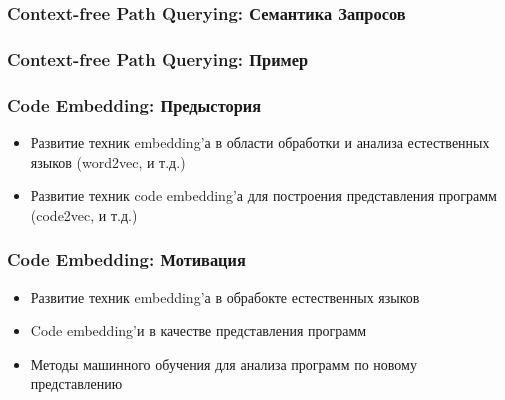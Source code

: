 \documentclass[xcolor=table,english]{beamer}
\begin{document}
\begin{frame}[fragile] \frametitle{Context-free Path Querying: Семантика Запросов}
    
\end{frame}

\begin{frame}[fragile] \frametitle{Context-free Path Querying: Пример}
    
\end{frame}

\begin{frame}[fragile] \frametitle{Code Embedding: Предыстория}
    \begin{itemize}
        \item Развитие техник embedding'а в области обработки и анализа естественных языков (word2vec, и т.д.)
        \item Развитие техник code embedding'а для построения представления программ (code2vec, и т.д.)
    \end{itemize}
\end{frame}

\begin{frame}[fragile] \frametitle{Code Embedding: Мотивация}
    \begin{itemize}
        \item Развитие техник embedding'а в обрабокте естественных языков
        \item Code embedding'и в качестве представления программ
        \item Методы машинного обучения для анализа программ по новому представлению
    \end{itemize}
\end{frame}
\end{document}
